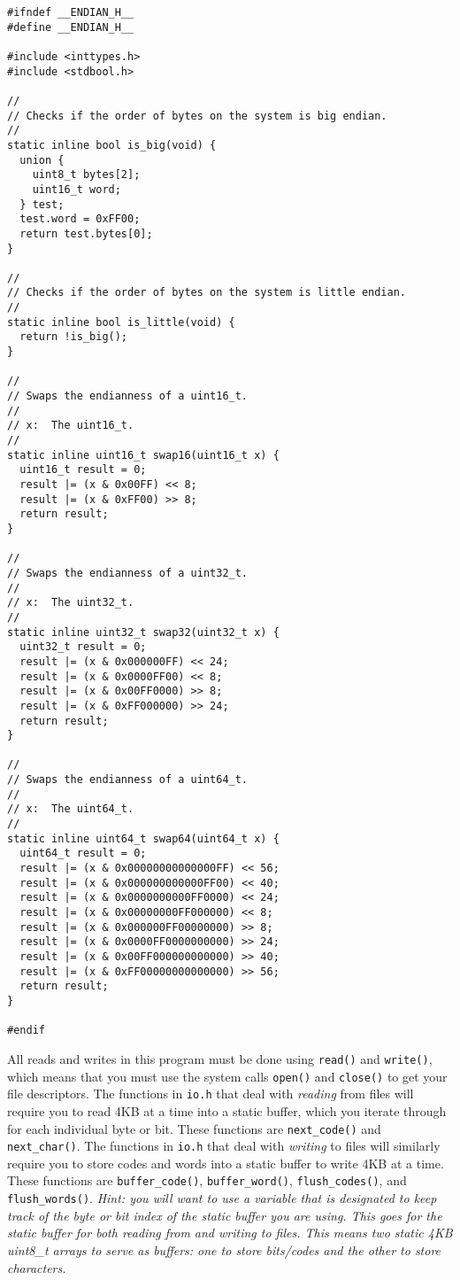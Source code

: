 \documentclass{article}
\begin{document}
\begin{lstlisting}[title=endian.h]
#ifndef __ENDIAN_H__
#define __ENDIAN_H__

#include <inttypes.h>
#include <stdbool.h>

//
// Checks if the order of bytes on the system is big endian.
//
static inline bool is_big(void) {
  union {
    uint8_t bytes[2];
    uint16_t word;
  } test;
  test.word = 0xFF00;
  return test.bytes[0];
}

//
// Checks if the order of bytes on the system is little endian.
//
static inline bool is_little(void) {
  return !is_big();
}

//
// Swaps the endianness of a uint16_t.
//
// x:  The uint16_t.
//
static inline uint16_t swap16(uint16_t x) {
  uint16_t result = 0;
  result |= (x & 0x00FF) << 8;
  result |= (x & 0xFF00) >> 8;
  return result;
}

//
// Swaps the endianness of a uint32_t.
//
// x:  The uint32_t.
//
static inline uint32_t swap32(uint32_t x) {
  uint32_t result = 0;
  result |= (x & 0x000000FF) << 24;
  result |= (x & 0x0000FF00) << 8;
  result |= (x & 0x00FF0000) >> 8;
  result |= (x & 0xFF000000) >> 24;
  return result;
}

//
// Swaps the endianness of a uint64_t.
//
// x:  The uint64_t.
//
static inline uint64_t swap64(uint64_t x) {
  uint64_t result = 0;
  result |= (x & 0x00000000000000FF) << 56;
  result |= (x & 0x000000000000FF00) << 40;
  result |= (x & 0x0000000000FF0000) << 24;
  result |= (x & 0x00000000FF000000) << 8;
  result |= (x & 0x000000FF00000000) >> 8;
  result |= (x & 0x0000FF0000000000) >> 24;
  result |= (x & 0x00FF000000000000) >> 40;
  result |= (x & 0xFF00000000000000) >> 56;
  return result;
}

#endif
\end{lstlisting}

All reads and writes in this program must be done using \texttt{read()} and
\texttt{write()}, which means that you must use the system calls \texttt{open()}
and \texttt{close()} to get your file descriptors.  The functions in
\texttt{io.h} that deal with \emph{reading} from files will require you to read
4KB at a time into a static buffer, which you iterate through for each
individual byte or bit. These functions are \texttt{next\_code()} and
\texttt{next\_char()}. The functions in \texttt{io.h} that deal with
\emph{writing} to files will similarly require you to store codes and words into
a static buffer to write 4KB at a time. These functions are
\texttt{buffer\_code()}, \texttt{buffer\_word()}, \texttt{flush\_codes()}, and
\texttt{flush\_words()}.  \emph{Hint: you will want to use a variable that is
designated to keep track of the byte or bit index of the static buffer you are
using. This goes for the static buffer for both reading from and writing to
files. This means two static 4KB uint8\_t arrays to serve as buffers: one to
store bits/codes and the other to store characters.}
\end{document}
